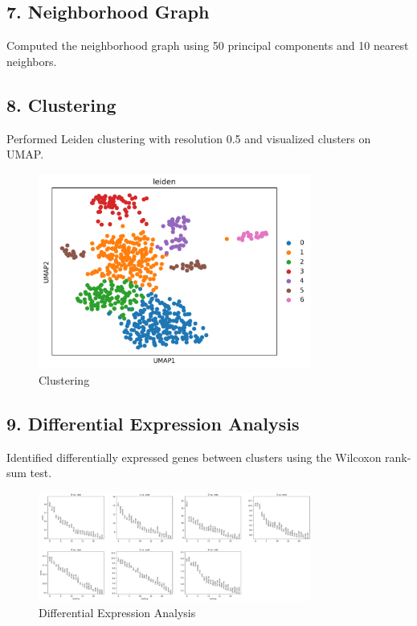 \documentclass[12pt]{article}
\begin{document}
\subsection{7. Neighborhood Graph}
Computed the neighborhood graph using 50 principal components and 10 nearest neighbors.

\subsection{8. Clustering}
Performed Leiden clustering with resolution 0.5 and visualized clusters on UMAP.

\begin{figure}[H]
    \centering
    \includegraphics[width=0.8\textwidth]{umap_clusters.png}
    \caption{Clustering}
    \label{fig:umap_clusters}
\end{figure}

\subsection{9. Differential Expression Analysis}
Identified differentially expressed genes between clusters using the Wilcoxon rank-sum test.

\begin{figure}[H]
    \centering
    \includegraphics[width=0.8\textwidth]{de.png}
    \caption{Differential Expression Analysis}
    \label{fig:de}
\end{figure}
\end{document}
